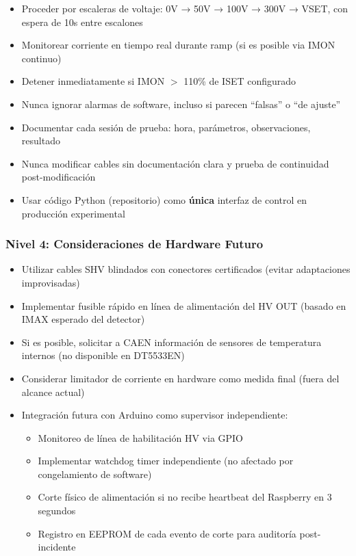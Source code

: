 \documentclass{article}
\begin{document}
\begin{itemize}
    \item Proceder por escaleras de voltaje: 0V → 50V → 100V → 300V → VSET, con espera de 10s entre escalones
    \item Monitorear corriente en tiempo real durante ramp (si es posible via IMON continuo)
    \item Detener inmediatamente si IMON $>$ 110\% de ISET configurado
    \item Nunca ignorar alarmas de software, incluso si parecen ``falsas'' o ``de ajuste''
    \item Documentar cada sesión de prueba: hora, parámetros, observaciones, resultado
    \item Nunca modificar cables sin documentación clara y prueba de continuidad post-modificación
    \item Usar código Python (repositorio) como \textbf{única} interfaz de control en producción experimental
\end{itemize}

\subsubsection{Nivel 4: Consideraciones de Hardware Futuro}

\begin{itemize}
    \item Utilizar cables SHV blindados con conectores certificados (evitar adaptaciones improvisadas)
    \item Implementar fusible rápido en línea de alimentación del HV OUT (basado en IMAX esperado del detector)
    \item Si es posible, solicitar a CAEN información de sensores de temperatura internos (no disponible en DT5533EN)
    \item Considerar limitador de corriente en hardware como medida final (fuera del alcance actual)
    \item Integración futura con Arduino como supervisor independiente:
    \begin{itemize}
        \item Monitoreo de línea de habilitación HV via GPIO
        \item Implementar watchdog timer independiente (no afectado por congelamiento de software)
        \item Corte físico de alimentación si no recibe heartbeat del Raspberry en 3 segundos
        \item Registro en EEPROM de cada evento de corte para auditoría post-incidente
    \end{itemize}
\end{itemize}
\end{document}
